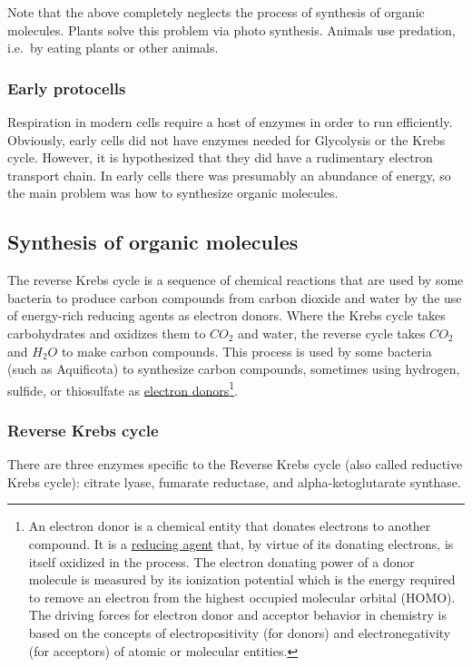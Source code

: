 \documentclass{article}
\begin{document}
Note that the above completely neglects the process of synthesis of organic molecules.
Plants solve this problem via photo synthesis. Animals use predation, i.e.\ by eating
plants or other animals.

\subsubsection{Early protocells}
Respiration in modern cells require a host of enzymes in order to run efficiently.
Obviously, early cells did not have enzymes needed for Glycolysis or the Krebs cycle.
However, it is hypothesized that they did have a rudimentary electron transport chain.
In early cells there was presumably an abundance of energy, so the main problem was
how to synthesize organic molecules.

\subsection{Synthesis of organic molecules}
The reverse Krebs cycle is a sequence of chemical reactions that are used by some bacteria
to produce carbon compounds from carbon dioxide and water by the use of energy-rich
reducing agents as electron donors.  Where the Krebs cycle takes carbohydrates and
oxidizes them to $CO_2$ and water, the reverse cycle takes $CO_2$ and $H_2O$ to make carbon
compounds. This process is used by some bacteria (such as Aquificota) to synthesize carbon
compounds, sometimes using hydrogen, sulfide, or thiosulfate as
\href{https://en.wikipedia.org/wiki/Electron_donor}{electron donors}\footnote{An
electron donor is a chemical entity that donates electrons to another compound. It is a
\href{https://en.wikipedia.org/wiki/Reducing_agent}{reducing agent} that, by virtue of
its donating electrons, is itself oxidized in the
process. The electron donating power of a donor molecule is measured by its ionization
potential which is the energy required to remove an electron from the highest occupied
molecular orbital (HOMO). The driving forces for electron donor and acceptor behavior in
chemistry is based on the concepts of electropositivity (for donors) and electronegativity
(for acceptors) of atomic or molecular entities.}.

\subsubsection{Reverse Krebs cycle}
There are three enzymes specific to the Reverse Krebs cycle (also called reductive Krebs
cycle): citrate lyase, fumarate reductase, and alpha-ketoglutarate synthase.
\end{document}
